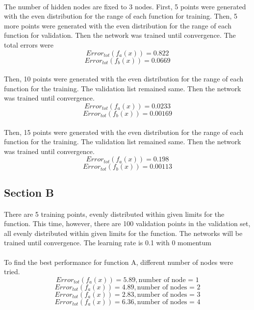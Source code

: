 \documentclass[12pt, letterpaper]{report}
\begin{document}
\paragraph*{} The number of hidden nodes are fixed to 3 nodes. First, 5 points were generated with the even distribution for the range of each function for training. Then, 5 more points were generated with the even distribution for the range of each function for validation. Then the network was trained until convergence. The total errors were
\[Error_{tot}(f_a(x)) = 0.822\]
\[Error_{tot}(f_b(x)) = 0.0669\]
\paragraph*{} Then, 10 points were generated with the even distribution for the range of each function for the training. The validation list remained same. Then the network was trained until convergence.
\[Error_{tot}(f_a(x)) = 0.0233\]
\[Error_{tot}(f_b(x)) = 0.00169\]
\paragraph*{} Then, 15 points were generated with the even distribution for the range of each function for the training. The validation list remained same. Then the network was trained until convergence.
\[Error_{tot}(f_a(x)) = 0.198\]
\[Error_{tot}(f_b(x)) = 0.00113\]
\subsection*{Section B}
\paragraph*{} There are 5 training points, evenly distributed within given limits for the function. This time, however, there are 100 validation points in the validation set, all evenly distributed within given limits for the function. The networks will be trained until convergence. The learning rate is 0.1 with 0 momentum
\paragraph*{} To find the best performance for function A, different number of nodes were tried.
\[ Error_{tot}(f_a(x)) = 5.89, \text{number of node = 1} \]
\[ Error_{tot}(f_a(x)) = 4.89, \text{number of nodes = 2} \]
\[ Error_{tot}(f_a(x)) = 2.83, \text{number of nodes = 3} \]
\[ Error_{tot}(f_a(x)) = 6.36, \text{number of nodes = 4} \]
\end{document}
